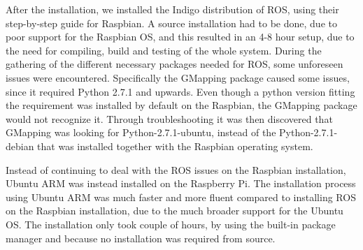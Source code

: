 After the installation, we installed the Indigo distribution of ROS, using their step-by-step guide for Raspbian.\cite{indigoins}
A source installation had to be done, due to poor support for the Raspbian OS, and this resulted in an 4-8 hour setup, due to the need for compiling, build and testing of the whole system. During the gathering of the different necessary packages needed for ROS, some unforeseen issues were encountered. Specifically the GMapping package caused some issues, since it required Python 2.7.1 and upwards. Even though a python version fitting the requirement was installed by default on the Raspbian, the GMapping package would not recognize it. Through troubleshooting it was then discovered that GMapping was looking for Python-2.7.1-ubuntu, instead of the Python-2.7.1-debian that was installed together with the Raspbian operating system.

Instead of continuing to deal with the ROS issues on the Raspbian installation, Ubuntu ARM was instead installed on the Raspberry Pi.\cite{ubuntuins}
The installation process using Ubuntu ARM was much faster and more fluent compared to installing ROS on the Raspbian installation, due to the much broader support for the Ubuntu OS. The installation only took couple of hours, by using the built-in package manager and because no installation was required from source.\cite{ubuntuROS}

